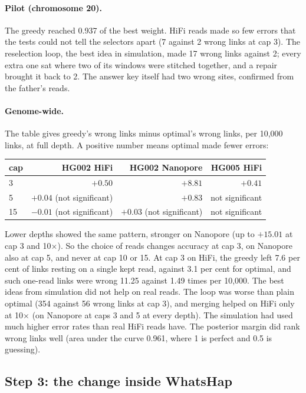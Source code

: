 \documentclass[11pt]{article}
\begin{document}
\paragraph{Pilot (chromosome 20).} The greedy reached 0.937 of the best
weight. HiFi reads made so few errors that the tests could not
tell the selectors apart (7 against 2 wrong links at cap 3). The reselection
loop, the best idea in simulation, made 17 wrong links against 2; every
extra one sat where two of its windows were stitched together, and a repair
brought it back to 2. The answer key itself had two wrong sites, confirmed
from the father's reads.

\paragraph{Genome-wide.} The table gives greedy's wrong links minus
optimal's wrong links, per 10{,}000 links, at full depth. A positive number
means optimal made fewer errors:

\begin{center}
\small
\begin{tabular}{@{}lrrr@{}}
\toprule
cap & HG002 HiFi & HG002 Nanopore & HG005 HiFi\\
\midrule
3 & $+0.50$ & $+8.81$ & $+0.41$\\
5 & $+0.04$ (not significant) & $+0.83$ & not significant\\
15 & $-0.01$ (not significant) & $+0.03$ (not significant) & not significant\\
\bottomrule
\end{tabular}
\end{center}

Lower depths showed the same pattern, stronger on Nanopore (up to
$+15.01$ at cap 3 and 10$\times$). So the choice of reads changes accuracy
at cap 3, on Nanopore also at cap 5, and never at cap 10 or 15. At cap 3 on
HiFi, the greedy left 7.6 per cent of links resting on a single kept read,
against 3.1 per cent for optimal, and such one-read links were wrong 11.25
against 1.49 times per 10{,}000. The best ideas from simulation did not help
on real reads. The loop was worse than plain optimal (354 against 56 wrong
links at cap 3), and merging helped on HiFi only at 10$\times$ (on Nanopore
at caps 3 and 5 at every depth). The simulation had used much higher error
rates than real HiFi reads have. The posterior margin did rank wrong links
well (area under the curve 0.961, where 1 is perfect and 0.5 is guessing).

\subsection{Step 3: the change inside WhatsHap}
\end{document}
